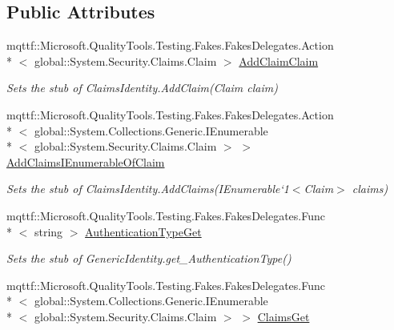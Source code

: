 \subsection*{Public Attributes}
\begin{DoxyCompactItemize}
\item 
mqttf\-::\-Microsoft.\-Quality\-Tools.\-Testing.\-Fakes.\-Fakes\-Delegates.\-Action\\*
$<$ global\-::\-System.\-Security.\-Claims.\-Claim $>$ \hyperlink{class_system_1_1_security_1_1_principal_1_1_fakes_1_1_stub_generic_identity_a2aad926643401c2457f7630063a9ab71}{Add\-Claim\-Claim}
\begin{DoxyCompactList}\small\item\em Sets the stub of Claims\-Identity.\-Add\-Claim(\-Claim claim)\end{DoxyCompactList}\item 
mqttf\-::\-Microsoft.\-Quality\-Tools.\-Testing.\-Fakes.\-Fakes\-Delegates.\-Action\\*
$<$ global\-::\-System.\-Collections.\-Generic.\-I\-Enumerable\\*
$<$ global\-::\-System.\-Security.\-Claims.\-Claim $>$ $>$ \hyperlink{class_system_1_1_security_1_1_principal_1_1_fakes_1_1_stub_generic_identity_ab3ae02d33ee89a2f32a737d9ede83d3a}{Add\-Claims\-I\-Enumerable\-Of\-Claim}
\begin{DoxyCompactList}\small\item\em Sets the stub of Claims\-Identity.\-Add\-Claims(I\-Enumerable`1$<$Claim$>$ claims)\end{DoxyCompactList}\item 
mqttf\-::\-Microsoft.\-Quality\-Tools.\-Testing.\-Fakes.\-Fakes\-Delegates.\-Func\\*
$<$ string $>$ \hyperlink{class_system_1_1_security_1_1_principal_1_1_fakes_1_1_stub_generic_identity_ad840567928279fdfb03a30a87263aa90}{Authentication\-Type\-Get}
\begin{DoxyCompactList}\small\item\em Sets the stub of Generic\-Identity.\-get\-\_\-\-Authentication\-Type()\end{DoxyCompactList}\item 
mqttf\-::\-Microsoft.\-Quality\-Tools.\-Testing.\-Fakes.\-Fakes\-Delegates.\-Func\\*
$<$ global\-::\-System.\-Collections.\-Generic.\-I\-Enumerable\\*
$<$ global\-::\-System.\-Security.\-Claims.\-Claim $>$ $>$ \hyperlink{class_system_1_1_security_1_1_principal_1_1_fakes_1_1_stub_generic_identity_a43231926ca941b74fa5ded86781d6d8f}{Claims\-Get}

\end{DoxyCompactItemize}
